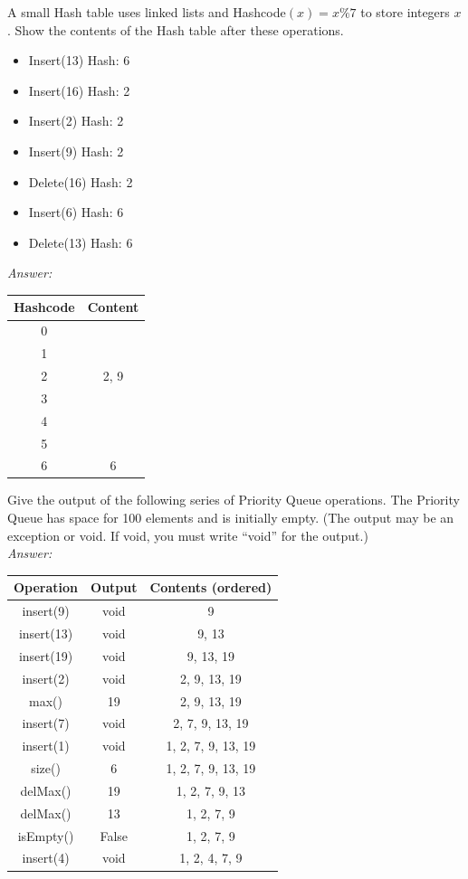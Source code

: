 \documentclass[a4paper]{article}
\newcommand{\ans}{\textit{Answer: }}
\newenvironment{question}[2][Question]{\begin{trivlist}
\item[\hskip \labelsep {\bfseries #1}\hskip \labelsep {\bfseries #2.}]}{\end{trivlist}}
\begin{document}
\begin{question}{12}
A small Hash table uses linked lists and Hashcode$(x) = x\%7$ to store integers $x$. Show the
contents of the Hash table after these operations.

\begin{itemize}
  \item Insert(13) Hash: 6
  \item Insert(16) Hash: 2
  \item Insert(2) Hash: 2
  \item Insert(9) Hash: 2
  \item Delete(16) Hash: 2
  \item Insert(6) Hash: 6
  \item Delete(13) Hash: 6
\end{itemize}
\ans \\
\begin{tabular}{c|c}
Hashcode & Content \\ \hline
0        &         \\
1        &         \\
2        & 2, 9    \\
3        &         \\
4        &         \\
5        &         \\
6        & 6      
\end{tabular}

\end{question}

\begin{question}{13}
Give the output of the following series of Priority Queue operations. The Priority Queue
has space for 100 elements and is initially empty. (The output may be an exception or void.
If void, you must write “void” for the output.) \\
\ans \\
\begin{tabular}{c|c|c}
\hline
Operation  & Output & Contents (ordered) \\ \hline
insert(9)  & void   & 9                  \\
insert(13) & void   & 9, 13              \\
insert(19) & void   & 9, 13, 19          \\
insert(2)  & void   & 2, 9, 13, 19       \\
max()      & 19     & 2, 9, 13, 19       \\
insert(7)  & void   & 2, 7, 9, 13, 19    \\
insert(1)  & void   & 1, 2, 7, 9, 13, 19 \\
size()     & 6      & 1, 2, 7, 9, 13, 19 \\
delMax()   & 19     & 1, 2, 7, 9, 13     \\
delMax()   & 13     & 1, 2, 7, 9         \\
isEmpty()  & False  & 1, 2, 7, 9         \\
insert(4)  & void   & 1, 2, 4, 7, 9     
\end{tabular}

\end{question}
\end{document}
